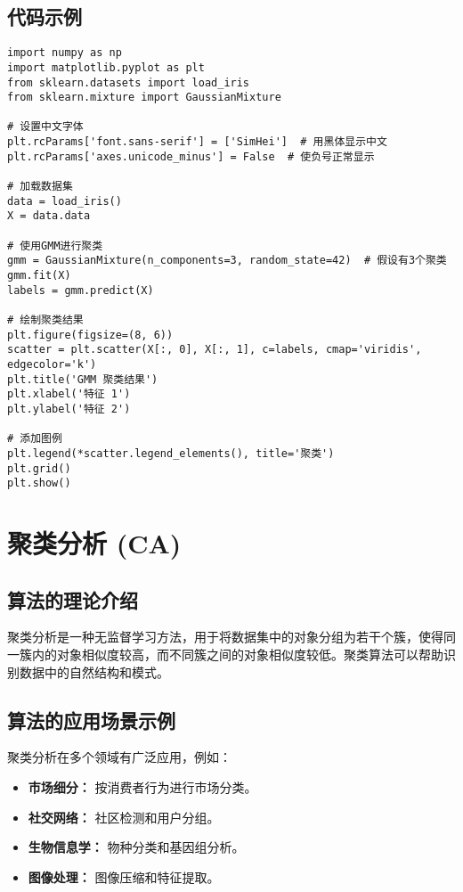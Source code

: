 \subsection*{代码示例}
\begin{lstlisting}
import numpy as np
import matplotlib.pyplot as plt
from sklearn.datasets import load_iris
from sklearn.mixture import GaussianMixture

# 设置中文字体
plt.rcParams['font.sans-serif'] = ['SimHei']  # 用黑体显示中文
plt.rcParams['axes.unicode_minus'] = False  # 使负号正常显示

# 加载数据集
data = load_iris()
X = data.data

# 使用GMM进行聚类
gmm = GaussianMixture(n_components=3, random_state=42)  # 假设有3个聚类
gmm.fit(X)
labels = gmm.predict(X)

# 绘制聚类结果
plt.figure(figsize=(8, 6))
scatter = plt.scatter(X[:, 0], X[:, 1], c=labels, cmap='viridis', edgecolor='k')
plt.title('GMM 聚类结果')
plt.xlabel('特征 1')
plt.ylabel('特征 2')

# 添加图例
plt.legend(*scatter.legend_elements(), title='聚类')
plt.grid()
plt.show()

\end{lstlisting}


\section{聚类分析 (CA)}
\subsection*{算法的理论介绍}
聚类分析是一种无监督学习方法，用于将数据集中的对象分组为若干个簇，使得同一簇内的对象相似度较高，而不同簇之间的对象相似度较低。聚类算法可以帮助识别数据中的自然结构和模式。

\subsection*{算法的应用场景示例}
聚类分析在多个领域有广泛应用，例如：
\begin{itemize}
    \item \textbf{市场细分：} 按消费者行为进行市场分类。
    \item \textbf{社交网络：} 社区检测和用户分组。
    \item \textbf{生物信息学：} 物种分类和基因组分析。
    \item \textbf{图像处理：} 图像压缩和特征提取。
\end{itemize}

